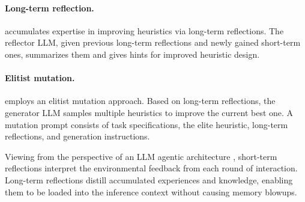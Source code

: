 \paragraph*{Long-term reflection. }\our{} accumulates expertise in improving heuristics via long-term reflections. The reflector LLM, given previous long-term reflections and newly gained short-term ones, summarizes them and gives hints for improved heuristic design.


\paragraph*{Elitist mutation. }\our{} employs an elitist mutation approach. Based on long-term reflections, the generator LLM samples multiple heuristics to improve the current best one. A mutation prompt consists of task specifications, the elite heuristic, long-term reflections, and generation instructions.

Viewing \our{} from the perspective of an LLM agentic architecture \cite{xi2023_llm_agents_survey}, short-term reflections interpret the environmental feedback from each round of interaction. Long-term reflections distill accumulated experiences and knowledge, enabling them to be loaded into the inference context without causing memory blowups.
